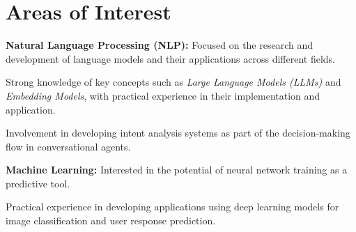 \section{Areas of Interest}

\begin{onecolentry}
\textbf{Natural Language Processing (NLP):} Focused on the research and development of language models and their applications across different fields.
\begin{highlights}
\item Strong knowledge of key concepts such as \textit{Large Language Models (LLMs)} and \textit{Embedding Models}, with practical experience in their implementation and application.
\item Involvement in developing intent analysis systems as part of the decision-making flow in conversational agents.
\end{highlights}
\end{onecolentry}

\begin{onecolentry}
\textbf{Machine Learning:} Interested in the potential of neural network training as a predictive tool.
\begin{highlights}
\item Practical experience in developing applications using deep learning models for image classification and user response prediction.
\end{highlights}
\end{onecolentry}